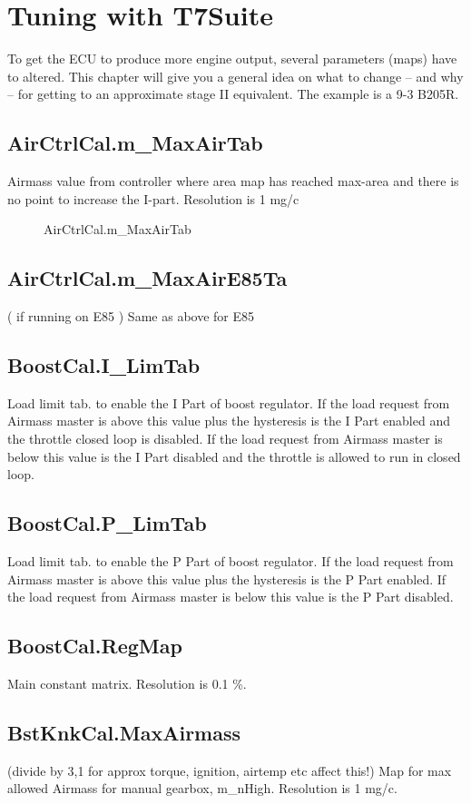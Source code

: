 \documentclass[11pt,a4paper]{book}
\newcommand{\Mfig}[1]{%
\begin{figure}[<+htpb+>]
    \centering
    \missingfigure{#1}
    \caption{#1}
\end{figure}}
\begin{document}
\section{Tuning with T7Suite}
To get the ECU to produce more engine output, several parameters (maps) have to altered. This
chapter will give you a general idea on what to change – and why – for getting to an approximate
stage II equivalent. The example is a 9-3 B205R.

\subsection{AirCtrlCal.m\_MaxAirTab}
Airmass value from controller where area map has reached max-area and there is no point to increase
the I-part. Resolution is 1 mg/c
\Mfig{AirCtrlCal.m\_MaxAirTab}

\subsection{AirCtrlCal.m\_MaxAirE85Ta}
( if running on E85 )
Same as above for E85

\subsection{BoostCal.I\_LimTab}
Load limit tab. to enable the I Part of boost regulator. If the load request from Airmass master is
above this value plus the hysteresis is the I Part enabled and the throttle closed loop is disabled. If
the load request from Airmass master is below this value is the I Part disabled and the throttle is
allowed to run in closed loop.

\subsection{BoostCal.P\_LimTab}
Load limit tab. to enable the P Part of boost regulator. If the load request from Airmass master is
above this value plus the hysteresis is the P Part enabled. If the load request from Airmass master is
below this value is the P Part disabled.

\subsection{BoostCal.RegMap}
Main constant matrix. Resolution is 0.1 \%.

\subsection{BstKnkCal.MaxAirmass}
(divide by 3,1 for approx torque, ignition, airtemp etc affect this!)
Map for max allowed Airmass for manual gearbox, m\_nHigh. Resolution is 1 mg/c.
\end{document}

